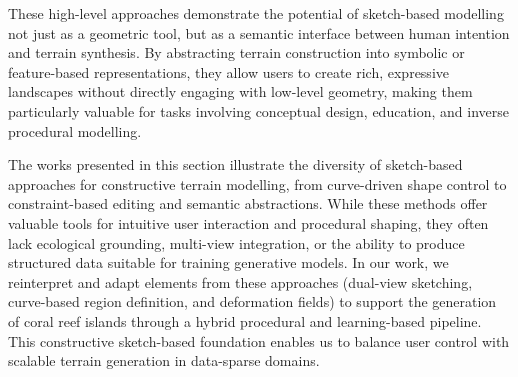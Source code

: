 
These high-level approaches demonstrate the potential of sketch-based modelling not just as a geometric tool, but as a semantic interface between human intention and terrain synthesis. By abstracting terrain construction into symbolic or feature-based representations, they allow users to create rich, expressive landscapes without directly engaging with low-level geometry, making them particularly valuable for tasks involving conceptual design, education, and inverse procedural modelling.

\midConclusion

The works presented in this section illustrate the diversity of sketch-based approaches for constructive terrain modelling, from curve-driven shape control to constraint-based editing and semantic abstractions. While these methods offer valuable tools for intuitive user interaction and procedural shaping, they often lack ecological grounding, multi-view integration, or the ability to produce structured data suitable for training generative models. In our work, we reinterpret and adapt elements from these approaches (dual-view sketching, curve-based region definition, and deformation fields) to support the generation of coral reef islands through a hybrid procedural and learning-based pipeline. This constructive sketch-based foundation enables us to balance user control with scalable terrain generation in data-sparse domains.

